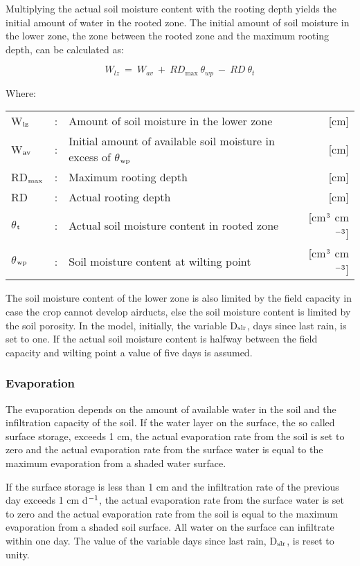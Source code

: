 Multiplying the actual soil moisture content with the rooting depth yields the initial
amount of water in the rooted zone. The initial amount of soil moisture in the lower zone,
the zone between the rooted zone and the maximum rooting depth, can be calculated as:

\begin{equation}
\label{eq:6.19}
W_{lz} ~ =~ W _{av} ~+~ RD_{\max } ~\theta_{wp} ~-~RD~\theta_{t} 
\end{equation}

Where:\\[5pt]
\begin{tabularx}{\textwidth}{llXr}
	W$_{{\rm lz}}$ &:& Amount of soil moisture in the lower zone & [cm]\\
	W$_{{\rm av}}$ &:& Initial amount of available soil moisture 
	in excess of $\theta$$_{{\rm wp}}$ & [cm]\\
	RD$_{{\rm max}}$ &:& Maximum rooting depth & [cm]\\
	RD &:& Actual rooting depth & [cm]\\
	$\theta$$_{{\rm t}}$ &:& Actual soil moisture content in rooted zone  
	& [cm$^{{\rm 3}}$ cm$^{{\rm -3}}$]\\
	$\theta$$_{{\rm wp}}$ &:& Soil moisture content at wilting point  
	& [cm$^{{\rm 3}}$ cm$^{{\rm -3}}$]\\
\end{tabularx}

The soil moisture content of the lower zone is also limited by the field capacity in case
the crop cannot develop airducts, else the soil moisture content is limited by the soil
porosity. In the model, initially, the variable D$_{{\rm slr}}$, days since last rain, is set 
to one. If the
actual soil moisture content is halfway between the field capacity and wilting point a
value of five days is assumed. 

\subsubsection{Evaporation}
The evaporation depends on the amount of available water in the soil and the infiltration
capacity of the soil. If the water layer on the surface, the so called surface storage, 
exceeds 1 cm, the actual evaporation rate from the soil is set to zero and the actual
evaporation rate from the surface water is equal to the maximum evaporation from a
shaded water surface.

If the surface storage is less than 1 cm and the infiltration rate of the previous day
exceeds 1 cm d$^{{\rm -1}}$, the actual evaporation rate from the surface water is set to zero and the
actual evaporation rate from the soil is equal to the maximum evaporation from a shaded
soil surface. All water on the surface can infiltrate within one day. The value of the
variable days since last rain, D$_{{\rm slr}}$, is reset to unity.

